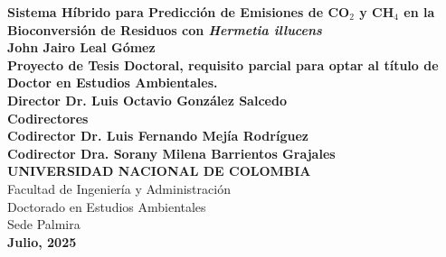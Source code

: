 \documentclass[10pt,spanish,fleqn,openany,twoside,letterpaper]{book}
\newcommand{\studentname}{}
\newcommand{\thesisname}{}
\newcommand{\director}{}
\newcommand{\codirector}{}
\newcommand{\codirectora}{}
\newcommand{\issuedate}{}
\newcommand{\sede}{}
\newcommand{\department}{}
\newcommand{\faculty}{}
\renewcommand{\studentname}{John Jairo Leal Gómez}
\renewcommand{\thesisname}{Sistema Híbrido para Predicción de Emisiones de CO$_2$ y CH$_4$ en la Bioconversión de Residuos con \textit{Hermetia illucens}}
\renewcommand{\issuedate}{2025}
\renewcommand{\director}{Director Dr. Luis Octavio González Salcedo}
\renewcommand{\codirector}{Codirector Dr. Luis Fernando Mejía Rodríguez }
\renewcommand{\codirectora}{Codirector Dra. Sorany Milena Barrientos Grajales }
\renewcommand{\sede}{Sede Palmira}
\renewcommand{\department}{Doctorado en Estudios Ambientales}
\renewcommand{\faculty}{Facultad de Ingeniería y Administración}
\begin{document}
\renewcommand{\listfigurename}{\sffamily Lista de figuras}
\renewcommand{\listtablename}{\sffamily Lista de tablas}
\renewcommand{\contentsname}{\sffamily Contenido}
\renewcommand{\chaptername}{\sffamily Capítulo}
\renewcommand{\tablename}{\scriptsize \centering \textbf{Tabla}}
\renewcommand{\figurename}{\scriptsize \centering \textbf{Figura}}
\renewcommand{\appendixname}{\sffamily Anexo}

\renewcommand{\bibname}{\sffamily Referencias Bibliográficas}


{\newpage
\thispagestyle{empty}
\begin{center}
\begin{figure}
\centering
{}%
\end{figure}
\vspace{1cm} %


{\large \textbf{\thesisname}} \\[3.0cm]


{\large \textbf{\studentname}} \\[2cm]

{\large \textbf{Proyecto de Tesis Doctoral, requisito parcial para optar al título de Doctor en Estudios
Ambientales.}} \\[2cm]

{\large \textbf{\director}} \\[2.5cm]
{\large \textbf{Codirectores}}\\
{\large \textbf{\codirector}} \\
{\large \textbf{\codirectora}} \\[2.5cm]


{\large \textbf{UNIVERSIDAD NACIONAL DE COLOMBIA}} \\[0.2cm]
{\large \faculty} \\[0.1cm]
{\large \department} \\[0.1cm]
{\large \sede} \\[0.1cm]


{\large \textbf{Julio, \issuedate}} \\[0.5cm]
\end{center}
}
\end{document}
